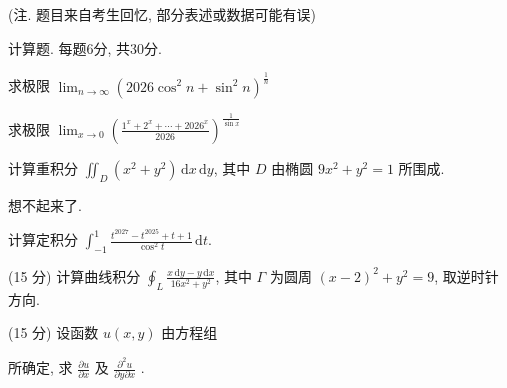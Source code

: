 (注. 题目来自考生回忆, 部分表述或数据可能有误)\par
\par{}
计算题. 每题6分, 共30分.\par
求极限 $\lim_{n\to \infty}(2026\cos^2 n + \sin^2 n)^{\frac{1}{n}}$\par
求极限  $\lim_{x\to0}\left(\frac{1^{x}+2^{x}+\cdots+2026^{x}}{2026}\right)^{\frac{1}{\sin x}}$\par
计算重积分 $\iint_{D} (x^{2} + y^{2}) \, \mathrm{d}x \, \mathrm{d}y$, 其中 $D$ 由椭圆 $9x^{2} + y^{2} = 1$ 所围成.\par
想不起来了.\par
计算定积分 $\int_{-1}^{1} \frac{t^{2027} - t^{2025} + t + 1}{\cos^2 t} \, \mathrm{d}t.$\par
\par{}
(15 分) 计算曲线积分 $\oint_{L} \frac{x \, \mathrm{d}y - y \, \mathrm{d}x}{16x^{2} + y^{2}}$, 其中 $\Gamma$ 为圆周 $(x - 2)^{2} + y^{2} = 9$, 取逆时针方向.\par
\par{}
\par{}
(15 分) 设函数 $u(x, y)$ 由方程组\par
\nopagebreak[4]
所确定, 求  $\frac{\partial u}{\partial x}$  及  $\frac{\partial^{2}u}{\partial y\partial x}$ .\par
\par{}
